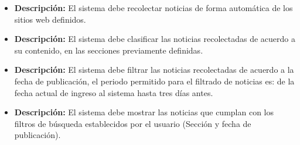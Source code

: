 
    \begin{itemize}
      \item \textbf{Descripción:} El sistema debe recolectar noticias de forma automática de los sitios web definidos.\\
    \end{itemize}
    \begin{itemize}
      \item \textbf{Descripción:} El sistema debe clasificar las noticias recolectadas de acuerdo a su contenido, en las secciones previamente definidas.\\
    \end{itemize}
    \begin{itemize}
      \item \textbf{Descripción:} El sistema debe filtrar las noticias recolectadas de acuerdo a la fecha de publicación, el periodo permitido para el filtrado 
      de noticias es: de la fecha actual de ingreso al sistema hasta tres días antes.\\
    \end{itemize}
    \begin{itemize}
      \item \textbf{Descripción:} El sistema debe mostrar las noticias que cumplan con los filtros de búsqueda establecidos por el usuario 
      (Sección y fecha de publicación).\\
    \end{itemize}
